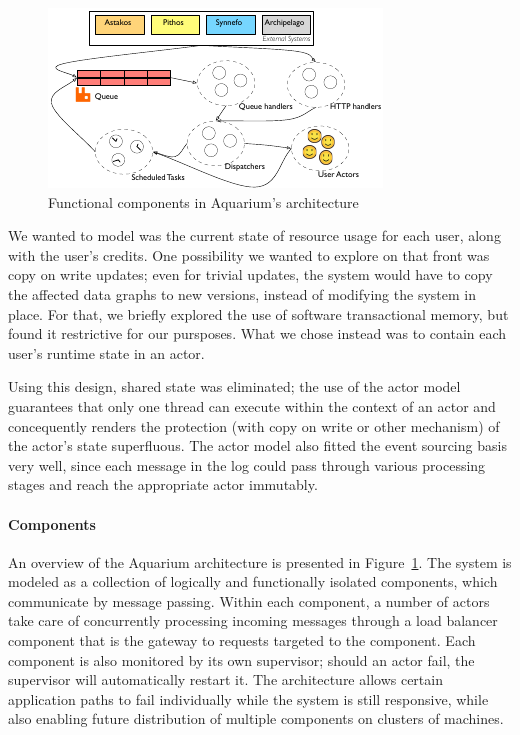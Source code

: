 \begin{figure}
    \begin{center}
    \includegraphics[scale=1.5]{arch.pdf}
    \end{center}
\caption{Functional components in Aquarium's architecture} 
\label{fig:arch}
\end{figure}

We wanted to model was the current state of resource usage for each
user, along with the user's credits. One possibility we wanted to
explore on that front was copy on write updates; even for trivial
updates, the system would have to copy the affected data graphs to new
versions, instead of modifying the system in place. For that, we
briefly explored the use of software transactional memory, but found
it restrictive for our pursposes. What we chose instead was to contain
each user's runtime state in an actor.%

Using this design, shared state was eliminated; the use of the actor
model guarantees that only one thread can execute within the context
of an actor and concequently renders the protection (with copy on
write or other mechanism) of the actor's state superfluous. The actor
model also fitted the event sourcing basis very well, since each
message in the log could pass through various processing stages and
reach the appropriate actor immutably.

\paragraph{Components} An overview of the Aquarium architecture is
presented in Figure~\ref{fig:arch}. The system is modeled as a
collection of logically and functionally isolated components, which
communicate by message passing. Within each component, a number of
actors take care of concurrently processing incoming messages through
a load balancer component that is the gateway to requests targeted to
the component. Each component is also monitored by its own supervisor;
should an actor fail, the supervisor will automatically restart it.
The architecture allows certain application paths to fail individually
while the system is still responsive, while also enabling future
distribution of multiple components on clusters of machines.

